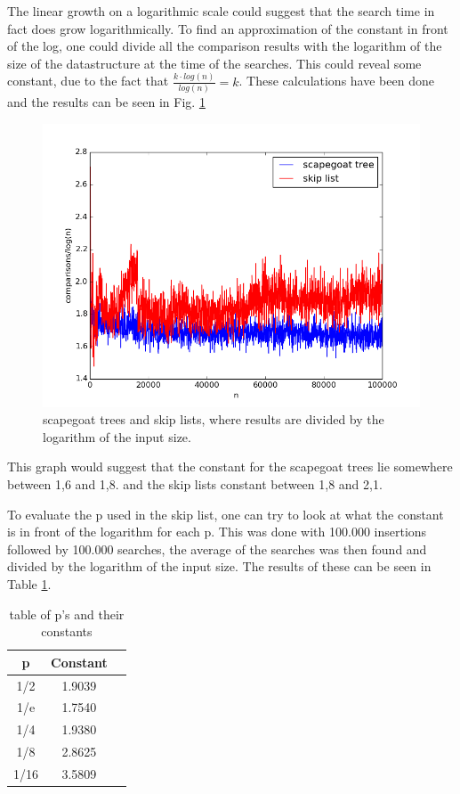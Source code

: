 \documentclass[12pt, a4paper]{article}
\begin{document}
The linear growth on a logarithmic scale could suggest that the search time in fact does grow logarithmically. To find an approximation 
of the constant in front of the log, one could divide all the comparison results with the logarithm of the size of the datastructure at the time
of the searches. This could reveal some constant, due to the fact that $\frac{k\cdot log(n)}{log(n)}=k$. These calculations have been done and the results
can be seen in Fig. \ref{divilog}

\begin{figure}[H]
    \centering
    \includegraphics[width=1\textwidth]{dividedlog.png}
    \caption{scapegoat trees and skip lists, where results are divided by the logarithm of the input size.}
    \label{divilog}
\end{figure}

This graph would suggest that the constant for the scapegoat trees lie somewhere between 1,6 and 1,8. and the skip lists constant between 1,8 and 2,1.

\medskip

To evaluate the p used in the skip list, one can try to look at what the constant is in front of the logarithm for each p. 
This was done with 100.000 insertions followed by 100.000 searches, the average of the searches was then found and divided by the logarithm of 
the input size. The results of these can be seen in Table \ref{table}.
\begin{table}
\centering
\caption{table of p's and their constants}
\label{table}
\begin{tabular}{|c|c|c|}
\hline
p                & Constant \\
\hline
1/2 & 1.9039   \\
\hline
1/e  & 1.7540   \\
\hline
1/4  & 1.9380   \\
\hline
1/8  & 2.8625   \\
\hline
1/16 & 3.5809  
\hline
\end{tabular}
\end{table}
\end{document}
